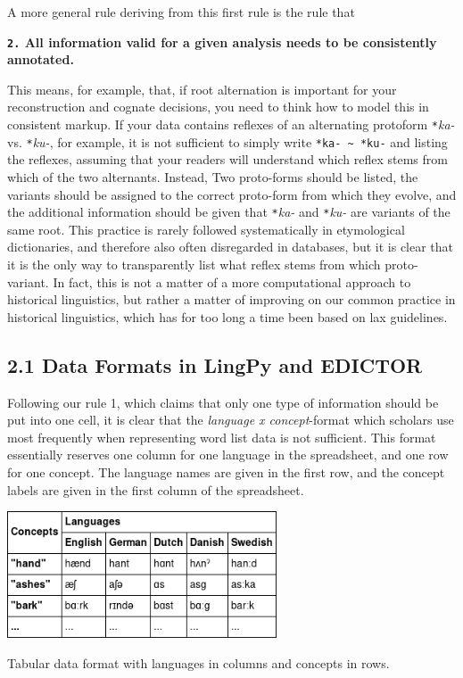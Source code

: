 \documentclass[a4paper,svgnames]{scrartcl}
\begin{document}
A more general rule deriving from this first rule is the rule that

\textbf{\texttt{2.} All information valid for a given analysis needs to
be consistently annotated.}

This means, for example, that, if root alternation is important for your
reconstruction and cognate decisions, you need to think how to model
this in consistent markup. If your data contains reflexes of an
alternating protoform \texttt{*}\emph{ka-} vs. \texttt{*}\emph{ku-}, for
example, it is not sufficient to simply write
\texttt{*ka-\ \textasciitilde{}\ *ku-} and listing the reflexes,
assuming that your readers will understand which reflex stems from which
of the two alternants. Instead, Two proto-forms should be listed, the
variants should be assigned to the correct proto-form from which they
evolve, and the additional information should be given that
\texttt{*}\emph{ka-} and \texttt{*}\emph{ku-} are variants of the same
root. This practice is rarely followed systematically in etymological
dictionaries, and therefore also often disregarded in databases, but it
is clear that it is the only way to transparently list what reflex stems
from which proto-variant. In fact, this is not a matter of a more
computational approach to historical linguistics, but rather a matter of
improving on our common practice in historical linguistics, which has
for too long a time been based on lax guidelines.

\subsection*{2.1 Data Formats in LingPy and
EDICTOR}\label{data-formats-in-lingpy-and-edictor}

Following our rule 1, which claims that only one type of information
should be put into one cell, it is clear that the \emph{language x
concept}-format which scholars use most frequently when representing
word list data is not sufficient. This format essentially reserves one
column for one language in the spreadsheet, and one row for one concept.
The language names are given in the first row, and the concept labels
are given in the first column of the spreadsheet.

\begin{table}
\centering
\includegraphics[width=8cm]{images/table-1.png}
\caption{Tabular data format with languages in columns and
concepts in rows.}
\end{table}
\end{document}
